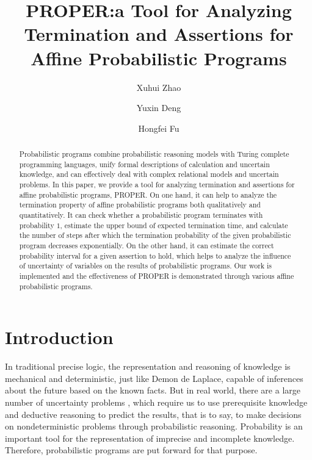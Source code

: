 \documentclass[runningheads]{llncs}
\begin{document}
%
\title{PROPER:a Tool for Analyzing Termination and Assertions for Affine Probabilistic Programs}
%
%
\author{Xuhui Zhao \and
Yuxin Deng \and
Hongfei Fu}
%
%
%
\maketitle              %
%
\begin{abstract}
Probabilistic programs combine probabilistic reasoning models with Turing complete programming languages, unify formal descriptions of calculation and uncertain knowledge, and can effectively deal with complex relational models and uncertain problems. In this paper, we provide a tool for analyzing termination and assertions for affine probabilistic programs, PROPER. On one hand, it can help to analyze the termination property of affine probabilistic programs both qualitatively and quantitatively. It can check whether a probabilistic program terminates with probability $1$, estimate the upper bound of expected termination time, and calculate the number of steps after which the termination probability of the given probabilistic program decreases exponentially.  On the other hand, it can estimate the correct probability interval for a given assertion to hold, which helps to analyze the influence of uncertainty of variables on the results of probabilistic programs. Our work is implemented and the effectiveness of PROPER is demonstrated through various affine probabilistic programs.

\end{abstract}
%
%
%
\section{Introduction}
In traditional precise logic, the representation and reasoning of knowledge is mechanical and deterministic, just like Demon de Laplace, capable of inferences about the future based on the known facts. But in real world, there are a large number of uncertainty problems , which require us to use prerequisite knowledge and deductive reasoning to predict the results, that is to say, to make decisions on nondeterministic problems through probabilistic reasoning. Probability is an important tool for the representation of imprecise and incomplete knowledge. Therefore, probabilistic programs are put forward for that purpose. 
\end{document}
